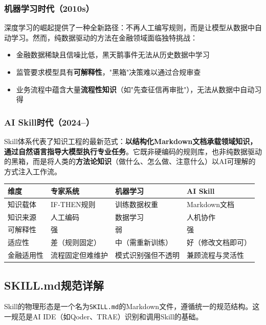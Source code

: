 \subsubsection{机器学习时代（2010s）}

深度学习的崛起提供了一种全新路径：不再人工编写规则，而是让模型从数据中自动学习。然而，纯数据驱动的方法在金融领域面临独特挑战：
\begin{itemize}[leftmargin=2em]
  \item 金融数据稀缺且信噪比低，黑天鹅事件无法从历史数据中学习
  \item 监管要求模型具有\textbf{可解释性}，"黑箱"决策难以通过合规审查
  \item 业务流程中蕴含大量\textbf{流程性知识}（如"先查征信再审批"），无法从数据中自动习得
\end{itemize}

\subsubsection{AI Skill时代（2024--）}

Skill体系代表了知识工程的最新范式：\textbf{以结构化Markdown文档承载领域知识，通过自然语言指导大模型执行专业任务}。它既非硬编码的规则库，也非纯数据驱动的黑箱，而是将人类的\textbf{方法论知识}（做什么、怎么做、注意什么）以AI可理解的方式注入工作流。

\begin{theorybox}[知识工程三大范式对比]
\begin{tabular}{lp{3.5cm}p{3.5cm}p{3.5cm}}
\toprule
\textbf{维度} & \textbf{专家系统} & \textbf{机器学习} & \textbf{AI Skill} \\
\midrule
知识载体 & IF-THEN规则 & 训练数据权重 & Markdown文档 \\
知识来源 & 人工编码 & 数据学习 & 人机协作 \\
可解释性 & 强 & 弱 & 强 \\
适应性 & 差（规则固定） & 中（需重新训练） & 好（修改文档即可） \\
金融适用性 & 流程固定但难维护 & 模式识别强但不透明 & 兼顾流程与灵活性 \\
\bottomrule
\end{tabular}
\end{theorybox}

\subsection{SKILL.md规范详解}

Skill的物理形态是一个名为\texttt{SKILL.md}的Markdown文件，遵循统一的规范结构。这一规范是AI IDE（如Qoder、TRAE）识别和调用Skill的基础。

